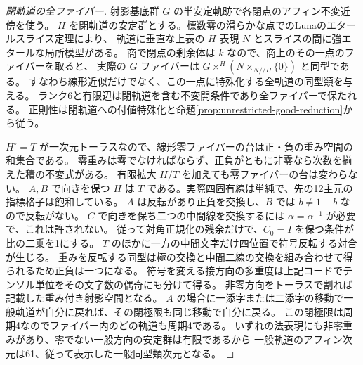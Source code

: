 \begin{proof}[閉軌道の全ファイバー]
射影基底群 $G$ の半安定軌跡で各閉点のアフィン不変近傍を使う。
$H$ を閉軌道の安定群とする。標数零の滑らかな点でのLunaのエタールスライス定理により、
軌道に垂直な上表の $H$ 表現 $N$ とスライスの間に強エタールな局所模型がある。
商で閉点の剰余体は $k$ なので、商上のその一点のファイバーを取ると、
実際の $G$ ファイバーは $G\times^H (N\mathbin{\times}_{N/\!/H}\{0\})$ と同型である。
すなわち線形近似だけでなく、この一点に特殊化する全軌道の同型類を与える。
ランク6と有限辺は閉軌道を含む不変開条件であり全ファイバーで保たれる。
正則性は閉軌道への付値特殊化と命題\ref{prop:unrestricted-good-reduction}から従う。

$H^\circ=T$ が一次元トーラスなので、線形零ファイバーの台は正・負の重み空間の和集合である。
零重みは零でなければならず、正負がともに非零なら次数を揃えた積の不変式がある。
有限拡大 $H/T$ を加えても零ファイバーの台は変わらない。
$A,B$ で向きを保つ $H$ は $T$ である。実際四固有線は単純で、先の12主元の指標格子は飽和している。
$A$ は反転があり正負を交換し、$B$ では $b\ne1-b$ なので反転がない。
$C$ で向きを保ち二つの中間線を交換するには $\alpha=\alpha^{-1}$ が必要で、これは許されない。
従って対角正規化の残余だけで、$C_0=I$ を保つ条件が比の二乗を1にする。
$T$ のほかに一方の中間文字だけ四位置で符号反転する対合が生じる。
重みを反転する同型は極の交換と中間二線の交換を組み合わせて得られるため正負は一つになる。
符号を変える接方向の多重度は上記コードでテンソル単位をその文字数の偶奇にも分けて得る。
非零方向をトーラスで割れば記載した重み付き射影空間となる。
$A$ の場合に一添字または二添字の移動で一般軌道が自分に戻れば、その閉極限も同じ移動で自分に戻る。
この閉極限は周期4なのでファイバー内のどの軌道も周期4である。
いずれの法表現にも非零重みがあり、零でない一般方向の安定群は有限であるから
一般軌道のアフィン次元は61、従って表示した一般同型類次元となる。
\end{proof}
